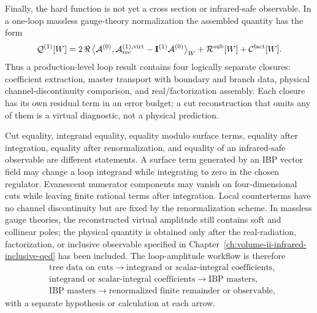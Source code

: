 \begin{controlledapproximation}
Finally, the hard function is not yet a cross section or infrared-safe
observable.  In a one-loop massless gauge-theory normalization the assembled
quantity has the form
\begin{equation}
  \mathcal Q^{(1)}[W]
  =
  2\,\Re\,
  \bigl\langle
    \mathcal A^{(0)},
    \mathcal A_{\rm rec}^{(1),{\rm virt}}
    -\mathbf I^{(1)}\mathcal A^{(0)}
  \bigr\rangle_W
  +\mathcal R^{\rm sub}[W]+\mathcal C^{\rm fact}[W].
  \label{eq:production-master-finite-observable}
\end{equation}
Thus a production-level loop result contains four logically separate
closures: coefficient extraction, master transport with boundary and branch
data, physical channel-discontinuity comparison, and real/factorization
assembly.  Each closure has its own residual term in an error budget; a cut
reconstruction that omits any of them is a virtual diagnostic, not a physical
prediction.
\end{controlledapproximation}

\begin{warning}
\label{warn:cut-equality-integrand-reduction-boundary}
Cut equality, integrand equality, equality modulo surface terms, equality
after integration, equality after renormalization, and equality of an
infrared-safe observable are different statements.  A surface term generated
by an IBP vector field may change a loop integrand while integrating to zero
in the chosen regulator.  Evanescent numerator components may vanish on
four-dimensional cuts while leaving finite rational terms after integration.
Local counterterms have no channel discontinuity but are fixed by the
renormalization scheme.  In massless gauge theories, the reconstructed virtual
amplitude still contains soft and collinear poles; the physical quantity is
obtained only after the real-radiation, factorization, or inclusive observable
specified in Chapter~\ref{ch:volume-ii-infrared-inclusive-qed}
has been included.  The loop-amplitude workflow is therefore
\[
  \begin{aligned}
  &\text{tree data on cuts}
    \longrightarrow
    \text{integrand or scalar-integral coefficients},\\
  &\text{integrand or scalar-integral coefficients}
    \longrightarrow
    \text{IBP masters},\\
  &\text{IBP masters}
    \longrightarrow
    \text{renormalized finite remainder or observable},
\end{aligned}
\]
with a separate hypothesis or calculation at each arrow.
\end{warning}

